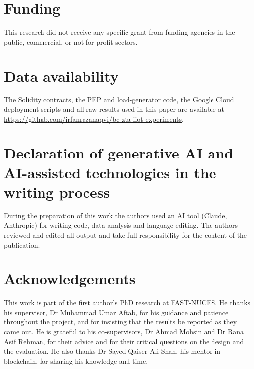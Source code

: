 \documentclass[a4paper,5p,times,twocolumn,number,sort&compress]{elsarticle}
\begin{document}
\section*{Funding}

This research did not receive any specific grant from funding agencies in the public, commercial, or not-for-profit sectors.

\section*{Data availability}

The Solidity contracts, the PEP and load-generator code, the Google Cloud deployment scripts and all raw results used in this paper are available at \url{https://github.com/irfanrazanaqvi/bc-zta-iiot-experiments}.

\section*{Declaration of generative AI and AI-assisted technologies in the writing process}

During the preparation of this work the authors used an AI tool (Claude, Anthropic) for writing code, data analysis and language editing. The authors reviewed and edited all output and take full responsibility for the content of the publication.

\section*{Acknowledgements}

This work is part of the first author's PhD research at FAST-NUCES. He thanks his supervisor, Dr Muhammad Umar Aftab, for his guidance and patience throughout the project, and for insisting that the results be reported as they came out. He is grateful to his co-supervisors, Dr Ahmad Mohsin and Dr Rana Asif Rehman, for their advice and for their critical questions on the design and the evaluation. He also thanks Dr Sayed Qaiser Ali Shah, his mentor in blockchain, for sharing his knowledge and time.
\end{document}

